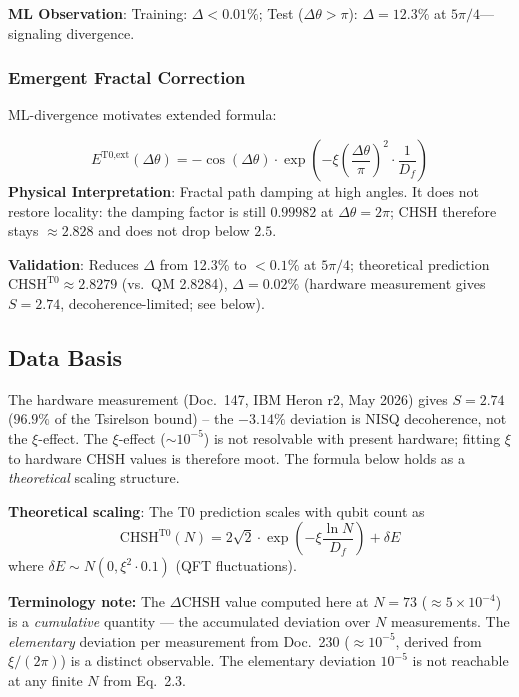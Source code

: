	\textbf{ML Observation}: Training: $\Delta<0.01\%$; Test ($\Delta\theta > \pi$): $\Delta=12.3\%$ at $5\pi/4$---signaling divergence.
	
	\subsubsection{Emergent Fractal Correction}
	
	ML-divergence motivates extended formula:
	\begin{tcolorbox}[colback=cyan!5!white,colframe=cyan!75!black,title={ML-Extended Bell Correlation}]
		\begin{equation}
			E^{\text{T0,ext}}(\Delta\theta) = -\cos(\Delta\theta) \cdot \exp\left(-\xi \left(\frac{\Delta\theta}{\pi}\right)^2 \cdot \frac{1}{D_f}\right) \tag{ML-Eq.~2.2}
		\end{equation}
		\textbf{Physical Interpretation}: Fractal path damping at high angles. It does not restore locality: the damping factor is still $0.99982$ at $\Delta\theta = 2\pi$; CHSH therefore stays $\approx 2.828$ and does not drop below $2.5$.
	\end{tcolorbox}
	
	\textbf{Validation}: Reduces $\Delta$ from 12.3\% to $<0.1\%$ at $5\pi/4$; theoretical prediction $\text{CHSH}^{\text{T0}} \approx 2.8279$ (vs.~QM 2.8284), $\Delta=0.02\%$ (hardware measurement gives $S=2.74$, decoherence-limited; see below).
	
	\subsection{Data Basis}
	
	The hardware measurement (Doc.~147, IBM Heron r2, May 2026) gives $S = 2.74$ ($96.9\%$ of the Tsirelson bound) -- the $-3.14\%$ deviation is NISQ decoherence, not the $\xi$-effect. The $\xi$-effect ($\sim 10^{-5}$) is not resolvable with present hardware; fitting $\xi$ to hardware CHSH values is therefore moot. The formula below holds as a \emph{theoretical} scaling structure.

	\textbf{Theoretical scaling}: The T0 prediction scales with qubit count as
	\begin{equation}
		\text{CHSH}^{\text{T0}}(N) = 2\sqrt{2} \cdot \exp\left(-\xi \frac{\ln N}{D_f}\right) + \delta E \tag{ML-Eq.~2.3}
	\end{equation}
	where $\delta E \sim N(0, \xi^2 \cdot 0.1)$ (QFT fluctuations).

	\textbf{Terminology note:} The $\Delta\text{CHSH}$ value computed here at $N = 73$
	($\approx 5 \times 10^{-4}$) is a \emph{cumulative} quantity — the accumulated
	deviation over $N$ measurements. The \emph{elementary} deviation per measurement
	from Doc.~230 ($\approx 10^{-5}$, derived from $\xi/(2\pi)$) is a distinct
	observable. The elementary deviation $10^{-5}$ is not reachable at any finite
	$N$ from Eq.~2.3.
	

